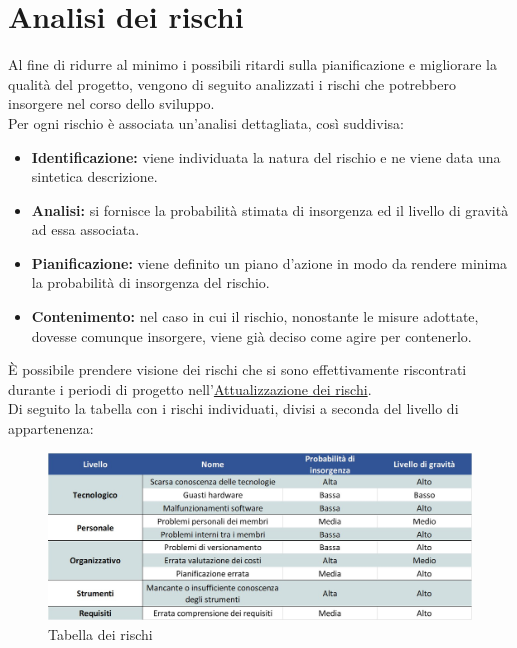 \newpage

\section{Analisi dei rischi}

Al fine di ridurre al minimo i possibili ritardi sulla pianificazione e migliorare la qualità del progetto, vengono di seguito analizzati i rischi che potrebbero insorgere nel corso dello sviluppo.\\
Per ogni rischio è associata un'analisi dettagliata, così suddivisa:

\begin{itemize}
	\item \textbf{Identificazione:} viene individuata la natura del rischio e ne viene data una sintetica descrizione.
	\item \textbf{Analisi:} si fornisce la probabilità stimata di insorgenza ed il livello di gravità ad essa associata.
	\item \textbf{Pianificazione:} viene definito un piano d'azione in modo da rendere minima la probabilità di insorgenza del rischio. 
	\item \textbf{Contenimento:} nel caso in cui il rischio, nonostante le misure adottate, dovesse comunque insorgere, viene già deciso come agire per contenerlo.
\end{itemize}

È possibile prendere visione dei rischi che si sono effettivamente riscontrati durante i periodi di progetto nell'\hyperref[RiscontroRischi]{Attualizzazione dei rischi}.\\
Di seguito la tabella con i rischi individuati, divisi a seconda del livello di appartenenza:

\begin{figure}[h!]
	\centerline{\includegraphics[scale=0.50]{img/TabellaRischi.jpg}}
	\caption{Tabella dei rischi}
	\label{fig:tab_risc}
\end{figure}


